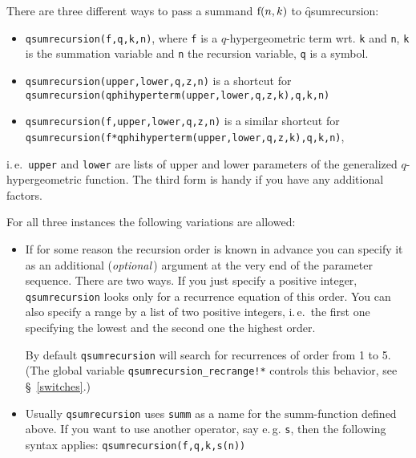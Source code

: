 There are three different ways to pass a summand ${\mathrm f}(n,k)$
to \f{qsumrecursion}:
%
\begin{itemize}
	\item \texttt{qsumrecursion(f,q,k,n)}, where \texttt{f} is a
		$q$-hypergeometric term wrt. \texttt{k} and \texttt{n},
		\texttt{k} is the summation variable and \texttt{n} the recursion
		variable, \texttt{q} is a symbol.
	\item \texttt{qsumrecursion(upper,lower,q,z,n)} is a shortcut for \\
		\texttt{qsumrecursion(qphihyperterm(upper,lower,q,z,k),q,k,n)}
	\item \texttt{qsumrecursion(f,upper,lower,q,z,n)} is a similar 
		shortcut for\\
		\texttt{qsumrecursion(f*qphihyperterm(upper,lower,q,z,k),q,k,n)},
\end{itemize}
%
i.\,e.\ \texttt{upper} and \texttt{lower} are lists of upper and lower
parameters of the generalized $q$-hypergeometric function.
The third form is handy if you have any additional factors.

For all three instances the following variations are allowed:
\begin{itemize}
	\item If for some reason the recursion order is known in
		advance you can specify it as an additional ({\sl optional}\,)
		argument at the very end of the parameter sequence. There are two
		ways. If you just specify a positive integer, 
		\texttt{qsumrecursion} looks only for a recurrence equation of this order.
		You can also specify a range by a list of two positive integers,
		i.\,e.\ the first one specifying the lowest and the second one the
		highest order.

		By default \texttt{qsumrecursion} will search for recurrences
		of order from 1 to 5. (The global variable 
		\texttt{qsumrecursion\_recrange!*} controls this behavior,
		see \S~\ref{switches}.)
	\item Usually \texttt{qsumrecursion} uses \texttt{summ} as a name
		for the $\mathrm{summ}$-function defined above. If you want
		to use another operator, say e.\,g. \texttt{s}, then the
		following syntax applies: \texttt{qsumrecursion(f,q,k,s(n))}
\end{itemize}

